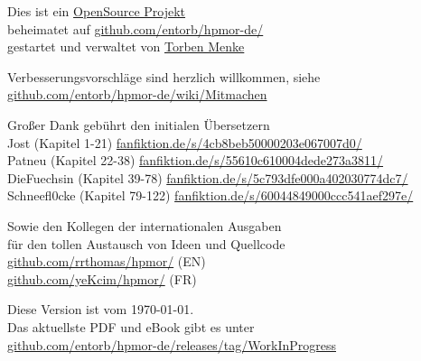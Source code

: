 \newpage
\begin{center}
\noindent
\vfill
Dies ist ein \href{https://github.com/entorb/hpmor-de/}{OpenSource Projekt}\\
beheimatet auf {\small\href{https://github.com/entorb/hpmor-de/}{github.com/entorb/hpmor-de/}}\\
gestartet und verwaltet von \href{https://entorb.net}{Torben Menke}

\vspace*{1\baselineskip}
Verbesserungsvorschläge sind herzlich willkommen, siehe\\
{\small\href{https://github.com/entorb/hpmor-de/wiki/Mitmachen}{github.com/entorb/hpmor-de/wiki/Mitmachen}}

\vspace*{1\baselineskip}
Großer Dank gebührt den initialen Übersetzern\\
Jost (Kapitel 1-21) {\small\href{https://www.fanfiktion.de/s/4cb8beb50000203e067007d0/}{fanfiktion.de/s/4cb8beb50000203e067007d0/}}\\
Patneu (Kapitel 22-38) {\small\href{https://www.fanfiktion.de/s/55610c610004dede273a3811/}{fanfiktion.de/s/55610c610004dede273a3811/}}\\
DieFuechsin (Kapitel 39-78) {\small\href{https://www.fanfiktion.de/s/5c793dfe000a402030774dc7/}{fanfiktion.de/s/5c793dfe000a402030774dc7/}}\\
Schneefl0cke (Kapitel 79-122) {\small\href{https://www.fanfiktion.de/s/60044849000ccc541aef297e/}{fanfiktion.de/s/60044849000ccc541aef297e/}}

\vspace*{1\baselineskip}
Sowie den Kollegen der internationalen Ausgaben\\
für den tollen Austausch von Ideen und Quellcode\\
{\small\href{https://github.com/rrthomas/hpmor/}{github.com/rrthomas/hpmor/}} (EN)\\
{\small\href{https://github.com/yeKcim/hpmor/}{github.com/yeKcim/hpmor/}} (FR)

\vspace*{1\baselineskip}
Diese Version ist vom \today{}.\\
Das aktuellste PDF und eBook gibt es unter\\
{\small\href{https://github.com/entorb/hpmor-de/releases/tag/WorkInProgress}{github.com/entorb/hpmor-de/releases/tag/WorkInProgress}}\\
\end{center}
